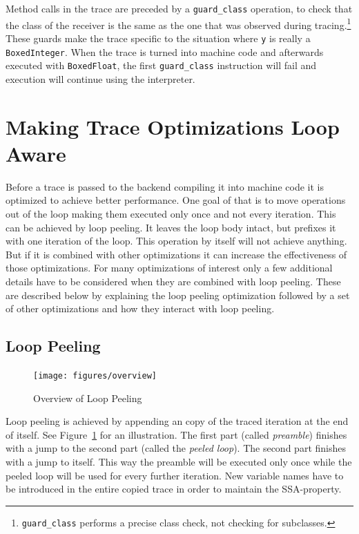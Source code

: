 \documentclass[preprint]{sigplanconf}
\begin{document}
Method calls in the trace are preceded by a \lstinline{guard_class}
operation, to check that the class of the receiver is the same as the one that
was observed during tracing.\footnote{\lstinline{guard_class}
performs a precise
class check, not checking for subclasses.} These guards make the trace specific
to the situation where \lstinline{y} is really a \lstinline{BoxedInteger}. When
the trace is turned into machine code and afterwards executed with
\lstinline{BoxedFloat}, the
first \lstinline{guard_class} instruction will fail and execution will continue
using the interpreter.

\section{Making Trace Optimizations Loop Aware}

Before a trace is passed to the backend compiling it into machine code
it is optimized to achieve better performance.
One goal of that is to move 
operations out of the loop making them executed only once
and not every iteration. This can be achieved by loop peeling. It
leaves the loop body intact, but prefixes it with one iteration of the
loop. This operation by itself will not achieve anything. But if it is
combined with other optimizations it can increase the effectiveness of
those optimizations. For many optimizations of interest only a few
additional details have to be considered when they are combined with loop peeling. These are
described below by explaining the loop peeling optimization
followed by a set of other optimizations and how they interact with
loop peeling.

\subsection{Loop Peeling}

\begin{figure}
\begin{center}
\texttt{[image: figures/overview]}
\end{center}
\caption{Overview of Loop Peeling}
\label{fig:overview}
\end{figure}

Loop peeling is achieved by appending an copy of the traced iteration at
the end of itself. See Figure~\ref{fig:overview} for an illustration.
The first part (called \emph{preamble}) finishes with a jump to the second part
(called the \emph{peeled loop}). The second part finishes with a jump to itself. This way
the preamble will be executed only once while the peeled loop will
be used for every further iteration. New variable names have to be
introduced in the entire copied trace in order to maintain the SSA-property.
\end{document}
